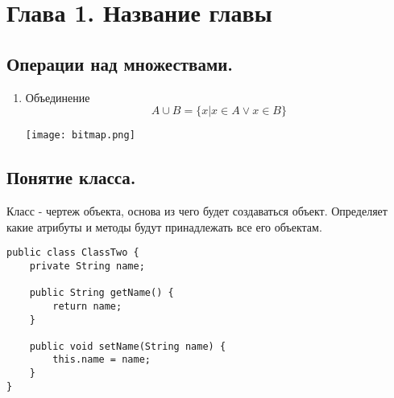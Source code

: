 \section{Глава 1. Название главы}
\subsection{Операции над множествами.}

\begin{enumerate}
    \item Объединение 
      \[A \cup B=\{x|x \in A \lor x\in B\}\]
    \begin{center}   
      \texttt{[image: bitmap.png]}
    \end{center}
  \end{enumerate}

\subsection{Понятие класса.}

Класс - чертеж объекта, основа из чего будет создаваться объект. Определяет какие атрибуты и методы будут принадлежать все его объектам.

\begin{lstlisting}
public class ClassTwo {
    private String name;

    public String getName() {
        return name;
    }
 
    public void setName(String name) {
        this.name = name;
    } 
}

\end{lstlisting}